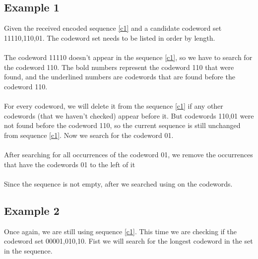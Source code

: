 \documentclass[10pt,letterpaper,notitlepage,draft]{article}
\theoremstyle{definition}
\begin{document}
\subsection{Example 1}
Given the received encoded sequence \ref{c1} and a candidate codeword set {11110,110,01}. The codeword set needs to be listed in order by length.\\

\\

The codeword 11110 doesn't appear in the sequence \ref{c1}, so we have to search for the codeword 110.
The bold numbers represent the codeword 110 that were found, and the underlined numbers are codewords that are found before the codeword 110.\\

\\

For every codeword, we will delete it from the sequence \ref{c1} if any other codewords (that we haven't checked) appear before it.
But codewords {110,01} were not found before the codeword 110, so the current sequence is still unchanged from sequence \ref{c1}.
Now we search for the codeword 01.\\

\\

After searching for all occurrences of the codeword 01, we remove the occurrences that have the codewords {01} to the left of it\\

\\

Since the sequence is not empty, after we searched using on the codewords.

\subsection{Example 2}
Once again, we are still using sequence \ref{c1}. 
This time we are checking if the codeword set {00001,010,10}.
Fist we will search for the longest codeword in the set in the sequence.\\
\end{document}
